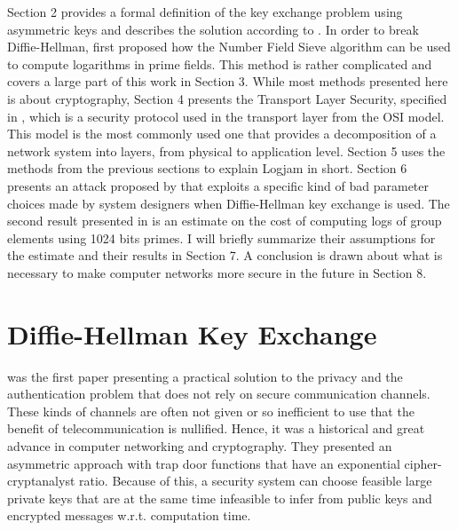 \documentclass[paper=a4, fontsize=11pt]{scrartcl} %
\numberwithin{equation}{section} %
\numberwithin{figure}{section} %
\numberwithin{table}{section} %
\begin{document}
Section 2 provides a formal definition of the key exchange problem using asymmetric keys and describes the solution according to \citep{diffie1976new}. In order to break Diffie-Hellman, \citep{gordon1993discrete} first proposed how the Number Field Sieve algorithm can be used to compute logarithms in prime fields. This method is rather complicated and covers a large part of this work in Section 3. While most methods presented here is about cryptography, Section 4 presents the Transport Layer Security, specified in \citep{dierks2008transport}, which is a security protocol used in the transport layer from the OSI model. This model is the most commonly used one that provides a decomposition of a network system into layers, from physical to application level. Section 5 uses the methods from the previous sections to explain Logjam in short. Section 6 presents an attack proposed by \citep{van1996diffie} that exploits a specific kind of bad parameter choices made by system designers when Diffie-Hellman key exchange is used. The second result presented in \citep{Adrian:2015:IFS:2810103.2813707} is an estimate on the cost of computing logs of group elements using 1024 bits primes. I will briefly summarize their assumptions for the estimate and their results in Section 7. A conclusion is drawn about what is necessary to make computer networks more secure in the future in Section 8.
\section{Diffie-Hellman Key Exchange}
\label{sec:DHKeyExchange}
\citep{diffie1976new} was the first paper presenting a practical solution to the privacy and the authentication problem that does not rely on secure communication channels. These kinds of channels are often not given or so inefficient to use that the benefit of telecommunication is nullified. Hence, it was a historical and great advance in computer networking and cryptography. They presented an asymmetric approach with trap door functions that have an exponential cipher-cryptanalyst ratio. Because of this, a security system can choose feasible large private keys that are at the same time infeasible to infer from public keys and encrypted messages w.r.t. computation time.
\end{document}
